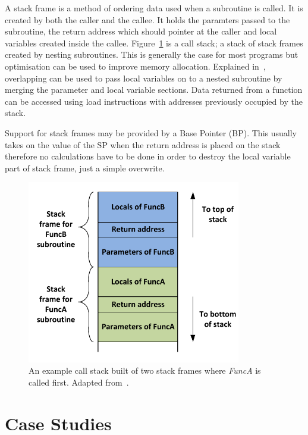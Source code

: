 \documentclass[12pt,a4paper]{article}
\begin{document}
A stack frame is a method of ordering data used when a subroutine is called.
It is created by both the caller and the callee.
It holds the paramters passed to the subroutine, the return address which should pointer at the caller and local variables created inside the callee.
Figure~\ref{fig:call} is a call stack; a stack of stack frames created by nesting subroutines.
This is generally the case for most programs but optimisation can be used to improve memory allocation.
Explained in~\cite{callWiki}, overlapping can be used to pass local variables on to a nested subroutine by merging the parameter and local variable sections.
Data returned from a function can be accessed using load instructions with addresses previously occupied by the stack.

Support for stack frames may be provided by a Base Pointer (BP).
This usually takes on the value of the SP when the return address is placed on the stack therefore no calculations have to be done in order to destroy the local variable part of stack frame, just a simple overwrite.

\begin{figure}[htb]
   \centering
   \includegraphics[height=8cm]{Figures/CallStack.pdf}
   \caption{An example call stack built of two stack frames where \emph{FuncA} is called first. Adapted from~\cite{callWiki}.}
   \label{fig:call}
\end{figure}






\section{Case Studies}
\label{case}
\end{document}
